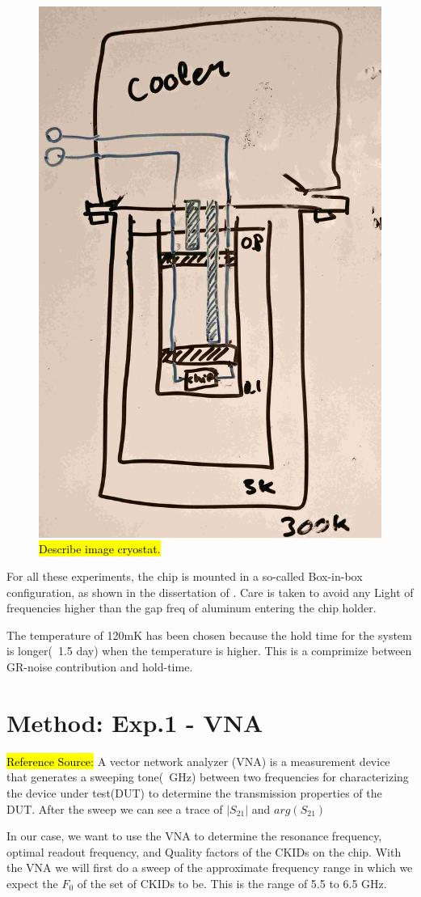 \begin{figure}[h!!!!!!!!!!]
	\centering
	\includegraphics[width=.40\linewidth]{figures/ch5_measurement/Cryostat_scematicV2.jpg}
	\caption{\hl{Describe image cryostat.}}
	\label{fig:ch6_cryostat_scematic}
\end{figure}

For all these experiments, the chip is mounted in a so-called Box-in-box configuration, as shown in the dissertation of \cite{devisserVisser2014Quasiparticle2014}. Care is taken to avoid any Light of frequencies higher than the gap freq of aluminum entering the chip holder.

The temperature of 120mK has been chosen because the hold time for the system is longer(~1.5 day) when the temperature is higher\cite{devisserVisser2014Quasiparticle2014}. This is a comprimize between GR-noise contribution and hold-time.

\FloatBarrier
\section{Method: Exp.1 - VNA}
\label{sec:M_VNA}
\hl{Reference Source:} \cite{devisserReadoutpowerHeatingHysteretic2010}
A vector network analyzer (VNA) is a measurement device that generates a sweeping tone(~GHz) between two frequencies for characterizing the device under test(DUT) to determine the transmission properties of the DUT. After the sweep we can see a trace of $|S_{21}|$ and $arg(S_{21})$

In our case, we want to use the VNA to determine the resonance frequency, optimal readout frequency, and Quality factors of the CKIDs on the chip. With the VNA we will first do a sweep of the approximate frequency range in which we expect the $F_0$ of the set of CKIDs to be. This is the range of 5.5 to 6.5 GHz.

